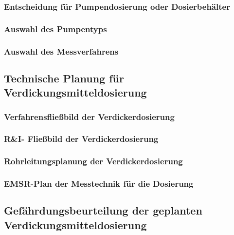 \subsubsection{Entscheidung für Pumpendosierung oder Dosierbehälter}

\subsubsection{Auswahl des Pumpentyps}


\subsubsection{Auswahl des Messverfahrens}

\subsection{Technische Planung für Verdickungsmitteldosierung}
\subsubsection{Verfahrensfließbild der Verdickerdosierung}
\subsubsection{R\&I- Fließbild der Verdickerdosierung}
\subsubsection{Rohrleitungsplanung der Verdickerdosierung}

\subsubsection{EMSR-Plan der Messtechnik für die Dosierung}

\subsection{Gefährdungsbeurteilung der geplanten Verdickungsmitteldosierung}


